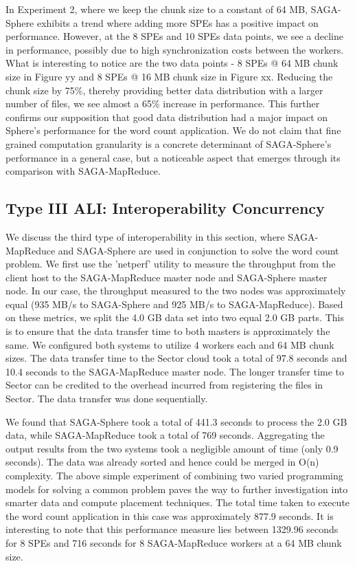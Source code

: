 \documentclass[3p,twocolumn]{elsarticle}
\begin{document}
In Experiment 2, where we keep the chunk size to a constant of 64 MB, SAGA-Sphere 
exhibits a trend where adding more SPEs has a positive impact on performance. However, 
at the 8 SPEs and 10 SPEs data points, we see a decline in performance, possibly 
due to high synchronization costs between the workers. What is interesting to 
notice are the two data points - 8 SPEs @ 64 MB chunk size in Figure yy 
and 8 SPEs @ 16 MB chunk size in Figure xx. Reducing the chunk size by 75\%, 
thereby providing better data distribution with a larger number of files, we 
see almost a 65\% increase in performance. This further confirms our 
supposition that good data distribution had a major impact on Sphere's performance for
the word count application. We do not claim that fine grained computation 
granularity is a concrete determinant of SAGA-Sphere's performance in a 
general case, but a noticeable aspect that emerges through its comparison with SAGA-MapReduce. 


\subsection{Type III ALI: Interoperability Concurrency}

We discuss the third type of interoperability in this section,
where SAGA-MapReduce and SAGA-Sphere are used in conjunction 
to solve the word count problem. We first use the 'netperf' 
utility to measure the throughput from the client host to 
the SAGA-MapReduce master node and SAGA-Sphere master node. 
In our case, the throughput measured to the two nodes was 
approximately equal (935 MB/s to SAGA-Sphere and 925 MB/s to SAGA-MapReduce). 
Based on these metrics, we split the 4.0 GB data set 
into two equal 2.0 GB parts. This is to ensure that the data 
transfer time to both masters is approximately the same. We 
configured both systems to utilize 4 workers each 
and 64 MB chunk sizes. The data transfer time to the Sector 
cloud took a total of 97.8 seconds and 10.4 seconds to the 
SAGA-MapReduce master node. The longer transfer time to Sector 
can be credited to the overhead incurred from registering 
the files in Sector. The data transfer was done sequentially. 

We found that SAGA-Sphere took a total of 441.3 seconds to 
process the 2.0 GB data, while SAGA-MapReduce took a total of 
769 seconds. Aggregating the output results from the two systems 
took a negligible amount of time (only 0.9 seconds). The data was 
already sorted and hence could be merged in O(n) complexity. 
The above simple experiment of combining two varied programming 
models for solving a common problem paves the way to further 
investigation into smarter data and compute placement techniques. 
The total time taken to execute the word count application in this 
case was approximately 877.9 seconds. It is interesting to 
note that this performance measure lies between 1329.96 seconds 
for 8 SPEs and 716 seconds for 8 SAGA-MapReduce workers at 
a 64 MB chunk size. 
\end{document}
